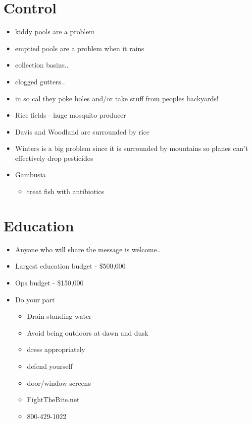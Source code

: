 \documentclass{article}
\begin{document}
    \section{Control}
    \begin{itemize}
        \item kiddy pools are a problem
        \item emptied pools are a problem when it rains
        \item collection basins..
        \item clogged gutters..
        \item in so cal they poke holes and/or take stuff from peoples backyards!
        \item Rice fields - huge mosquito producer
        \item Davis and Woodland are surrounded by rice
        \item Winters is a big problem since it is surrounded by mountains so planes can't effectively drop pesticides
        \item Gambusia
        \begin{itemize}
            \item treat fish with antibiotics
        \end{itemize}
    \end{itemize}

    \section{Education}
    \begin{itemize}
        \item Anyone who will share the message is welcome..
        \item Largest education budget - \$500,000
        \item Ops budget - \$150,000
        \item Do your part
        \begin{itemize}
            \item Drain standing water
            \item Avoid being outdoors at dawn and dusk
            \item dress appropriately
            \item defend yourself
            \item door/window screens
            \item FightTheBite.net
            \item 800-429-1022
        \end{itemize}
    \end{itemize}
\end{document}
